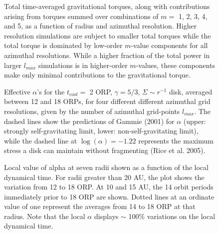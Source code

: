 \documentclass[manuscript]{aastex}
\begin{document}
\begin{figure}
\caption
{
Total time-averaged gravitational  torques, along with contributions arising from torques
summed over combinations of  $m = $ 1, 2, 3, 4, and 5,
as a function of radius and azimuthal resolution. 
Higher resolution simulations are subject to smaller total torques while the total torque is dominated by low-order $m$-value
components for all azimuthal resolutions.  While a higher fraction of the total power in larger $l_{max}$ simulations is in higher-order $m$-values, these components make only minimal contributions to the gravitational torque. 
}
\label{fig:torquearray}
\end{figure}


\begin{figure}
\caption
{Effective $\alpha$'s for the $t_{cool} =$ 2 ORP, $\gamma = 5/3$, $\Sigma \sim r^{ -1}$ disk, averaged between 12 and 18 ORPs, for four different different azimuthal grid resolutions, given by the number of azimuthal grid-points $l_{max}$. The dashed lines show the predictions of Gammie (2001) for $\alpha$ (upper: strongly self-gravitating limit, lower: non-self-gravitating limit), while the dashed line at $\log(\alpha) = -1.22$ represents the maximum stress a disk can maintain without fragmenting (Rice et al. 2005). 
}
\label{fig:alpha_v_radius}
\end{figure}
\newpage

\begin{figure}
\caption{
Local value of alpha at seven radii shown as a function of the local dynamical time.  For radii greater than 20 AU, the plot shows 
the variation from 12 to 18 ORP.  At 10 and 15 AU, the 14 orbit periods immediately prior to 18 ORP are shown.
Dotted lines at an ordinate value of one  represent the averages from 14 to 18 ORP at that radius.
Note that the local $\alpha$ displays $\sim$ 100\% variations on the local dynamical time. 
}
\label{fig:alphavar}
\end{figure}
\end{document}
